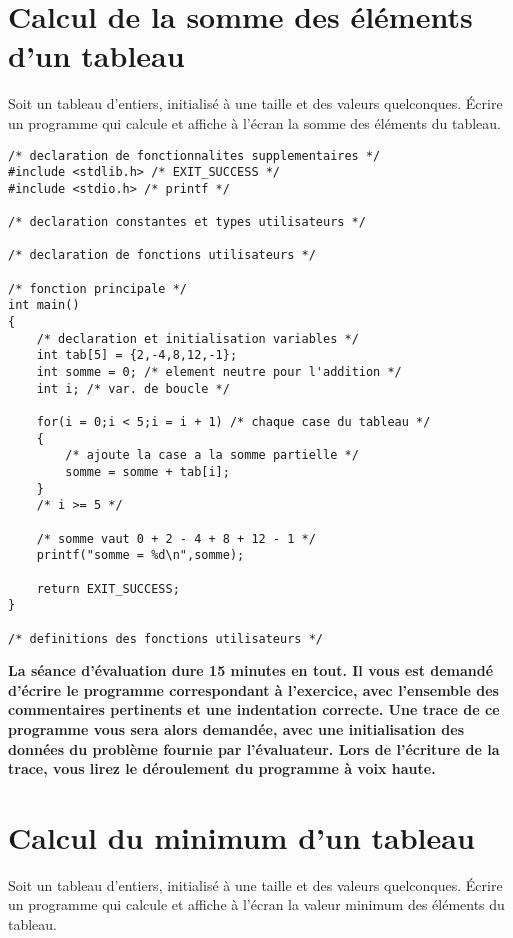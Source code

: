 \section{Calcul de la somme des éléments d'un tableau}

Soit un tableau d'entiers, initialisé à une taille et des
valeurs quelconques. Écrire un programme qui calcule et affiche à
l'écran la somme des éléments du tableau.

\begin{correction}
\begin{verbatim}
/* declaration de fonctionnalites supplementaires */
#include <stdlib.h> /* EXIT_SUCCESS */
#include <stdio.h> /* printf */

/* declaration constantes et types utilisateurs */

/* declaration de fonctions utilisateurs */

/* fonction principale */
int main()
{
    /* declaration et initialisation variables */
    int tab[5] = {2,-4,8,12,-1};
    int somme = 0; /* element neutre pour l'addition */
    int i; /* var. de boucle */

    for(i = 0;i < 5;i = i + 1) /* chaque case du tableau */
    {
        /* ajoute la case a la somme partielle */
        somme = somme + tab[i];
    }
    /* i >= 5 */

    /* somme vaut 0 + 2 - 4 + 8 + 12 - 1 */
    printf("somme = %d\n",somme);

    return EXIT_SUCCESS;
}

/* definitions des fonctions utilisateurs */
\end{verbatim}
\end{correction}

\newpage
\textbf{La séance d'évaluation dure 15 minutes en tout. Il vous est demandé d'écrire le programme correspondant à l'exercice, avec l'ensemble des commentaires pertinents et une indentation correcte. Une trace de ce programme vous sera alors demandée, avec une initialisation des données du problème fournie par l'évaluateur. Lors de l'écriture de la trace, vous lirez le déroulement du programme à voix haute.}

\section{Calcul du minimum d'un tableau}
 
Soit un tableau d'entiers, initialisé à une taille et des
valeurs quelconques. Écrire un programme qui calcule et affiche à
l'écran la valeur minimum des éléments du tableau.

